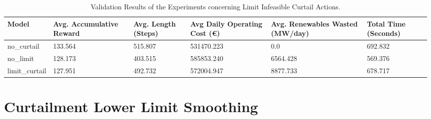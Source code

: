 \begin{table}[ht]
	\centering
	\begin{tabularx}{\textwidth}{|l|X|X|X|X|X|}
		\hline
		\textbf{Model} & \textbf{Avg. Accumulative Reward}& \textbf{Avg. Length (Steps)} & \textbf{Avg Daily Operating Cost (€)} & \textbf{Avg. Renewables Wasted (MW/day)} & \textbf{Total Time (Seconds)}\\
		\hline
		no\_curtail & 133.564 & 515.807  & 531470.223 & 0.0 & 692.832\\
		no\_limit & 128.173 & 403.515 & 585853.240 & 6564.428 & 569.376 \\
		limit\_curtail & 127.951 &  492.732 & 572004.947 & 8877.733 & 678.717 \\
		\hline
	\end{tabularx}
	\caption{Validation Results of the Experiments concerning Limit Infeasible Curtail Actions.}
	\label{fig:curtail-val}
\end{table}

\section{Curtailment Lower Limit Smoothing}

